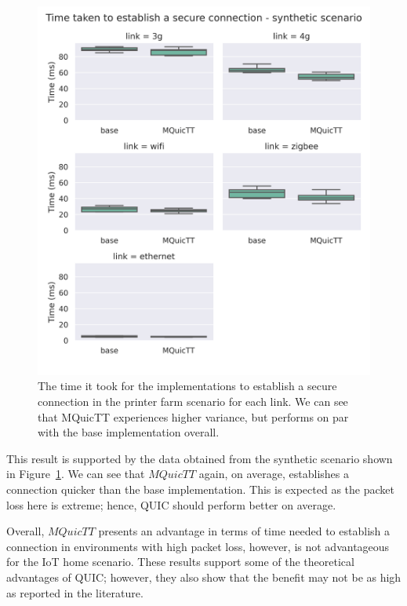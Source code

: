 \begin{figure}
    \centering
    \includegraphics[width=1\linewidth]{images/analysis_connection_time_synth.png}
    \caption{The time it took for the implementations to establish a secure connection in the printer farm scenario for each link.
        We can see that MQuicTT experiences higher variance, but performs on par with the base implementation overall.}
    \label{fig:connect_time_synth}
\end{figure}

This result is supported by the data obtained from the synthetic scenario shown in Figure~\ref{fig:connect_time_synth}.
We can see that $MQuicTT$ again, on average, establishes a connection quicker than the base implementation.
This is expected as the packet loss here is extreme; hence, QUIC should perform better on average.

Overall, $MQuicTT$ presents an advantage in terms of time needed to establish a connection in environments with high packet loss, however, is not advantageous for the IoT home scenario.
These results support some of the theoretical advantages of QUIC; however, they also show that the benefit may not be as high as reported in the literature.
